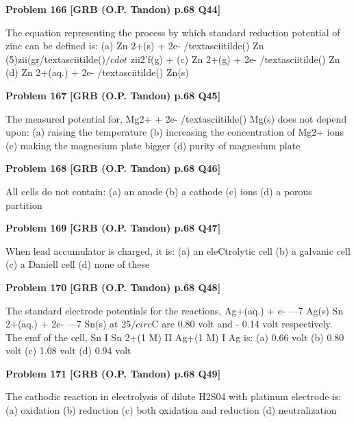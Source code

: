 \begin{problembox}
\textbf{Problem 166} \hfill \textbf{[GRB (O.P. Tandon) p.68 Q44]}
\label{q:ext-grb_all_questions-166}

The equation representing the process by which standard 
reduction potential of zinc can be defined is: 
(a) Zn 2+(s) + 2e- /textasciitilde() 
Zn 
(5)zii(gr/textasciitilde()$/cdot$ zii2'f(g) + 
(c) Zn 2+(g) + 2e- /textasciitilde() 
Zn 
(d) Zn 2+(aq.) + 2e- /textasciitilde() 
Zn(s)
\end{problembox}

\begin{problembox}
\textbf{Problem 167} \hfill \textbf{[GRB (O.P. Tandon) p.68 Q45]}
\label{q:ext-grb_all_questions-167}

The measured potential for, 
Mg2+ + 2e- /textasciitilde() 
Mg(s) 
does not depend upon: 
(a) raising the temperature 
(b) increasing the concentration of Mg2+ ions 
(c) making the magnesium plate bigger 
(d) purity of magnesium plate
\end{problembox}

\begin{problembox}
\textbf{Problem 168} \hfill \textbf{[GRB (O.P. Tandon) p.68 Q46]}
\label{q:ext-grb_all_questions-168}

All cells do not contain: 
(a) an anode 
(b) a cathode 
(c) ions 
(d) a porous partition
\end{problembox}

\begin{problembox}
\textbf{Problem 169} \hfill \textbf{[GRB (O.P. Tandon) p.68 Q47]}
\label{q:ext-grb_all_questions-169}

When lead accumulator is charged, it is: 
(a) an eleCtrolytic cell 
(b) a galvanic cell 
(c) a Daniell cell 
(d) none of these
\end{problembox}

\begin{problembox}
\textbf{Problem 170} \hfill \textbf{[GRB (O.P. Tandon) p.68 Q48]}
\label{q:ext-grb_all_questions-170}

The standard electrode potentials for the reactions, 
Ag+(aq.) + e- ---7 Ag(s) 
Sn 2+(aq.) + 2e- ---7 Sn(s) 
at 25$/circ$C are 0.80 volt and - 0.14 volt respectively. The emf of 
the cell, 
Sn I Sn 2+(1 M) II Ag+(1 M) I Ag 
is: 
(a) 0.66 volt (b) 0.80 volt (c) 1.08 volt (d) 0.94 volt
\end{problembox}

\begin{problembox}
\textbf{Problem 171} \hfill \textbf{[GRB (O.P. Tandon) p.68 Q49]}
\label{q:ext-grb_all_questions-171}

The cathodic reaction in electrolysis of dilute H2S04 with 
platinum electrode is: 
(a) oxidation 
(b) reduction 
(c) both oxidation and reduction 
(d) neutralization
\end{problembox}

